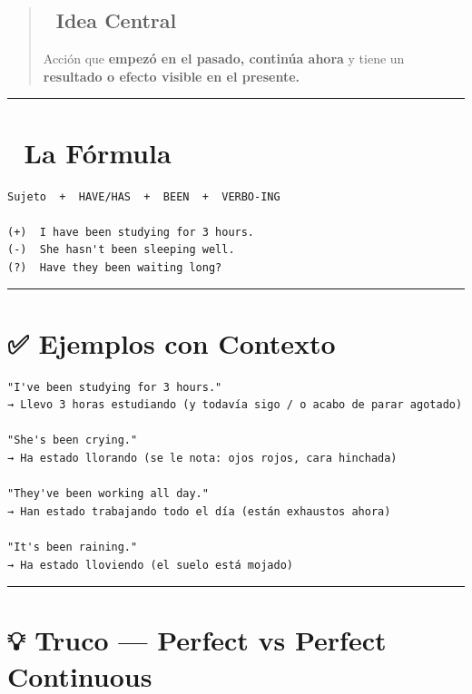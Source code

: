 \documentclass[
  spanish,
  letterpaper,
]{scrbook}
\begin{document}
\begin{quote}
\subsection{🎯 Idea Central}\label{idea-central-7}

Acción que \textbf{empezó en el pasado, continúa ahora} y tiene un
\textbf{resultado o efecto visible en el presente.}
\end{quote}

\begin{center}\rule{0.5\linewidth}{0.5pt}\end{center}

\section{📐 La Fórmula}\label{la-fuxf3rmula-4}

\begin{verbatim}
Sujeto  +  HAVE/HAS  +  BEEN  +  VERBO-ING

(+)  I have been studying for 3 hours.
(-)  She hasn't been sleeping well.
(?)  Have they been waiting long?
\end{verbatim}

\begin{center}\rule{0.5\linewidth}{0.5pt}\end{center}

\section{✅ Ejemplos con Contexto}\label{ejemplos-con-contexto}

\begin{verbatim}
"I've been studying for 3 hours."
→ Llevo 3 horas estudiando (y todavía sigo / o acabo de parar agotado)

"She's been crying."
→ Ha estado llorando (se le nota: ojos rojos, cara hinchada)

"They've been working all day."
→ Han estado trabajando todo el día (están exhaustos ahora)

"It's been raining."
→ Ha estado lloviendo (el suelo está mojado)
\end{verbatim}

\begin{center}\rule{0.5\linewidth}{0.5pt}\end{center}

\section{💡 Truco --- Perfect vs Perfect
Continuous}\label{truco-perfect-vs-perfect-continuous}
\end{document}
